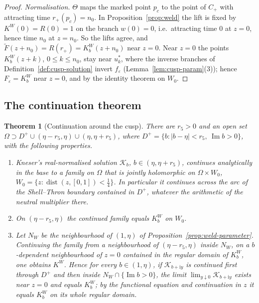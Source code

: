 \documentclass[11pt]{amsart}
\newtheorem{theorem}{Theorem}[section]
\theoremstyle{definition}
\newcommand{\Rr}{R}
\newcommand{\Kk}{K}
\newcommand{\ii}{\mathrm{i}}
\begin{document}
\begin{proof}
\emph{Normalisation.}  $\Theta$ maps the marked point $p_c$ to the point of $C_+$
with attracting time $r_+(p_c)=n_0$.  In Proposition~\ref{prop:weld} the lift is
fixed by $\Kk^W(0)=\Rr(0)=1$ on the branch $w(0)=0$, i.e.\ attracting time $0$
at $z=0$, hence time $n_0$ at $z=n_0$.  So the lifts agree, and
$\tilde F(z+n_0)=\Rr(r_+)=\Kk^W_b(z+n_0)$ near $z=0$.  Near $z=0$ the points
$\Kk^W_b(z+k)$, $0\le k\le n_0$, stay near $u^*_k$, where the inverse branches of
Definition~\ref{def:cusp-solution} invert $f_\varepsilon$ (Lemma~\ref{lem:cusp-param}(3));
hence $F_\varepsilon=\Kk^W_b$ near $z=0$, and by the identity theorem on $W_0$.
\end{proof}

\subsection{The continuation theorem}

\begin{theorem}[Continuation around the cusp]\label{thm:cusp}
There are $r_5>0$ and an open set $\Omega\supset D^+\cup(\eta-r_5,\eta)\cup(\eta,\eta+r_5)$,
where $D^+=\{b:|b-\eta|<r_5,\ \operatorname{Im}b>0\}$, with the following properties.
\begin{enumerate}
\item Kneser's real-normalised solution $\mathcal K_b$, $b\in(\eta,\eta+r_5)$, continues
  analytically in the base to a family on $\Omega$ that is jointly holomorphic on
  $\Omega\times W_0$, $W_0=\{z:\operatorname{dist}(z,[0,1])<\tfrac14\}$.  In particular it
  continues across the arc of the Shell--Thron boundary contained in $D^+$,
  whatever the arithmetic of the neutral multiplier there.
\item On $(\eta-r_5,\eta)$ the continued family equals $\Kk^W_b$ on $W_0$.
\item Let $N_W$ be the neighbourhood of $(1,\eta)$ of
  Proposition~\ref{prop:weld-parameter}.  Continuing the family from a
  neighbourhood of $(\eta-r_5,\eta)$ inside $N_W$, on a $b$-dependent
  neighbourhood of $z=0$ contained in the regular domain of $\Kk^W_b$, one
  obtains $\Kk^W$.  Hence for every $b\in(1,\eta)$, if $\mathcal K_{b+\ii y}$ is continued first
  through $D^+$ and then inside $N_W\cap\{\operatorname{Im}b>0\}$, the limit
  $\lim_{y\downarrow0}\mathcal K_{b+\ii y}$ exists near $z=0$ and equals $\Kk^W_b$; by the
  functional equation and continuation in $z$ it equals $\Kk^W_b$ on its whole
  regular domain.
\end{enumerate}
\end{theorem}
\end{document}
